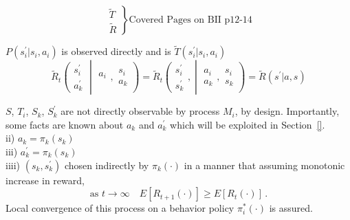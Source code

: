 \begin{equation*}
\left. \begin{array}{l}
\tilde{T}\\
\tilde{R}
\end{array}\right\}
\text{Covered Pages on BII p12-14}
\end{equation*}

$P(s^\prime_i|s_i, a_i)$ is observed directly and is $\tilde{T}( s^\prime_i | s_i, a_i )$\\


\begin{equation*}
\tilde{R}_t\left(  \begin{array}{l} s^\prime_i \\ a^\prime_k \end{array}
\middle| 
\begin{array}{c}  a_i \\ \end{array},
\begin{array}{c} s_i \\ a_k \end{array}
\right) 
=
\tilde{R}_t\left( 
\begin{array}{c} s^\prime_i \\ s^\prime_k \end{array}, \middle|
\begin{array}{c} a_i \\ a_k \end{array},
\begin{array}{c} s_i \\ s_k \end{array}
\right)
=
\tilde{R}( s^\prime | a, s )
\end{equation*}


$S$, $T_i$, $S_k$, $S^\prime_k$ are not directly observable by process $M_i$, by design. Importantly, some facts are known about $a_k$ and $a^\prime_k$ which will be exploited in Section~\ref{}.\\

ii) $a_k=\pi_k(s_k)$\\
iii) $a^\prime_k=\pi_k(s_k)$\\
iiii) $\left(s_k,s^\prime_k\right)$ chosen indirectly by $\pi_k(\cdot)$ in a manner that assuming monotonic increase in reward,
\begin{equation*}
  \text{as\ }t \to \infty \quad E[R_{t+1}(\cdot)] \geq E[R_t(\cdot)]\,.
\end{equation*}
Local convergence of this process on a behavior policy $\pi^*_i(\cdot)$ is assured.

